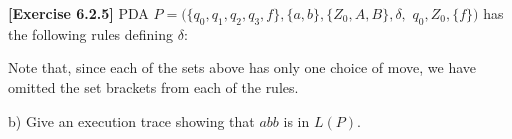 \textbf{[Exercise 6.2.5]} PDA 
$P=(\{q_0,q_1,q_2,q_3,f\},\{a,b\},\{Z_0,A,B\},\delta,$ $q_0,Z_0,\{f\})$ has the following 
rules defining $\delta$:


Note that, since each of the sets above has only one choice of move, we have omitted
the set brackets from each of the rules.

b) Give an execution trace showing that $abb$ is in $L(P)$.